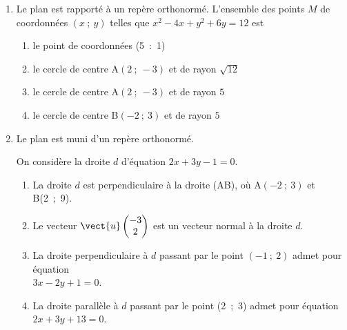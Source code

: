 \begin{enumerate}
		\medskip

\item Le plan est rapporté à un repère orthonormé. L'ensemble des points $M$ de coordonnées $(x~;~y)$ telles que $x^2 - 4x +y^2 + 6y = 12$ est
	\begin{enumerate}
		\item le point de coordonnées (5~:~1)
		\item le cercle de centre A$(2~;~-3)$ et de rayon $\sqrt{12}$
		\item le cercle de centre A$(2~;~-3)$ et de rayon $5$
		\item le cercle de centre B$(-2~;~3)$ et de rayon $5$
	\end{enumerate}
	
		\medskip

\item Le plan est muni d'un repère orthonormé.

On considère la droite $d$ d'équation $2x + 3y - 1 = 0$.
	\begin{enumerate}
		\item La droite $d$ est perpendiculaire à la droite (AB), où A$(-2~;~3)$ et B(2~;~9).
		\item  Le vecteur $\vect{u}\begin{pmatrix}-3\\2\end{pmatrix}$ est un vecteur normal à la droite $d$.
		\item  La droite perpendiculaire à $d$ passant par le point $(-1~;~2)$ admet pour équation \\ $3x- 2y+1=0$.
		\item  La droite parallèle à $d$ passant par le point (2~;~3) admet pour équation $2x + 3y + 13 = 0$.
	\end{enumerate}
\end{enumerate}

\bigskip
